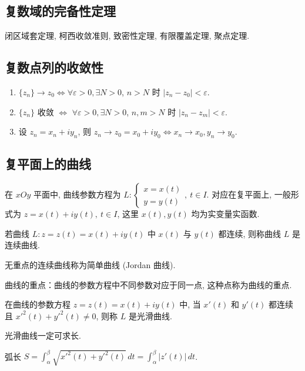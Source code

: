 \documentclass[theorem=false,mathfont=none,openany,sub3section]{easybook}
\begin{document}
\subsection{复数域的完备性定理}

闭区域套定理, 柯西收敛准则, 致密性定理, 有限覆盖定理, 聚点定理.

\subsection{复数点列的收敛性}

\begin{enumerate}
  \item $\{z_{n}\}\to z_{0}\Longleftrightarrow\forall\varepsilon>0,\exists N>0$, $n>N$ 时 $|z_{n}-z_{0}|<\varepsilon$.
  \item $\{z_{n}\}$ 收敛 $\Leftrightarrow$ $\forall\varepsilon>0,\exists N>0$, $n,m>N$ 时 $|z_{n}-z_{m}|<\varepsilon$.
  \item 设 $z_{n}=x_{n}+iy_{n}$, 则 $z_{n}\to z_{0}=x_{0}+iy_{0}\Leftrightarrow x_{n}\to x_{0}, y_{n}\to y_{0}$.
\end{enumerate}

\subsection{复平面上的曲线}

在 $xOy$ 平面中, 曲线参数方程为 $L:\begin{cases}x=x(t)\\y=y(t)\end{cases},\ t\in I$. 对应在复平面上, 一般形式为 $z=x(t)+iy(t),\ t\in I$, 这里 $x(t),y(t)$ 均为实变量实函数.

\begin{definition}
  若曲线 $L:z=z(t)=x(t)+iy(t)$ 中 $x(t)$ 与 $y(t)$ 都连续, 则称曲线 $L$ 是连续曲线.
\end{definition}

\begin{definition}
  无重点的连续曲线称为简单曲线 (Jordan 曲线).\par
  曲线的重点：曲线的参数方程中不同参数对应于同一点, 这种点称为曲线的重点.
\end{definition}

\begin{definition}
  在曲线的参数方程 $z=z(t)=x(t)+iy(t)$ 中, 当 $x'(t)$ 和 $y'(t)$ 都连续且 $x'^{2}(t)+y'^{2}(t)\neq0$, 则称 $L$ 是光滑曲线.
\end{definition}

\begin{proposition}
  光滑曲线一定可求长.\par
  弧长 $S=\int_{\alpha}^{\beta}\sqrt{x'^{2}(t)+y'^{2}(t)}\,dt=\int_{\alpha}^{\beta}|z'(t)|\,dt$.
\end{proposition}
\end{document}
